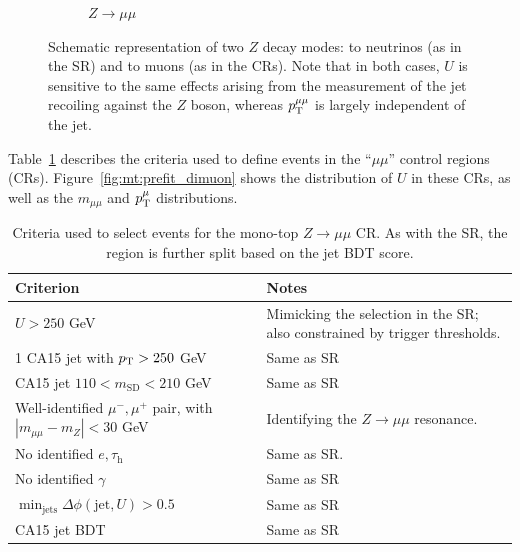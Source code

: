 \begin{figure}[]
\begin{center}
\begin{subfigure}[t]{0.49\textwidth}
            \caption{$Z\rightarrow\mu\mu$}
        \end{subfigure}
        \caption{Schematic representation of two $Z$ decay modes: to neutrinos (as in the SR) and to muons (as in the CRs).
                 Note that in both cases, $U$ is sensitive to the same effects arising from the measurement of the jet recoiling against the $Z$ boson, whereas $p_\mathrm{T}^{\mu\mu}$ is largely independent of the jet.}
        \label{fig:mt:zvsz}
    \end{center}
\end{figure}

Table~\ref{tab:mt:zmm_cuts} describes the criteria used to define events in the ``$\mu\mu$'' control regions (CRs).
Figure~\ref{fig:mt:prefit_dimuon} shows the distribution of $U$ in these CRs, as well as the $m_{\mu\mu}$ and $p_\mathrm{T}^\mu$ distributions.

\begin{table}[]
    \caption{Criteria used to select events for the mono-top $Z\rightarrow\mu\mu$ CR. As with the SR, the region is further split based on the jet BDT score.}
    \label{tab:mt:zmm_cuts}
    \centering
    \begin{tabular}{p{}p{}}
        Criterion & Notes \\
        \hline
        \hline
        $U>250$ GeV & Mimicking the selection in the SR; also constrained by trigger thresholds. \\
        1 CA15 jet with $p_\mathrm{T}>250$ GeV &  Same as SR \\
        CA15 jet $110 < m_\mathrm{SD} < 210$ GeV & Same as SR \\
        \hline
        Well-identified $\mu^-,\mu^+$ pair, with $|m_{\mu\mu}-m_Z|<30$ GeV & Identifying the $Z\rightarrow\mu\mu$ resonance. \\
        No identified $e,\tau_\mathrm{h}$ & Same as SR. \\
        No identified $\gamma$ & Same as SR \\
        \hline
        $\min_\mathrm{jets}\Delta\phi(\mathrm{jet},U) > 0.5$ & Same as SR \\
        \hline
        CA15 jet BDT & Same as SR\\
    \end{tabular}
\end{table}

